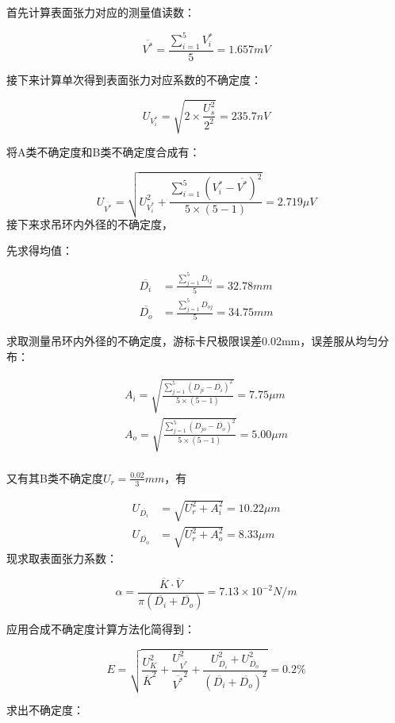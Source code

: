 \documentclass{ctexart}
\begin{document}
首先计算表面张力对应的测量值读数：

$$ \overline{V^\ast} = \frac{\sum\limits_{i=1}^{5} V_i^\ast}{5} = 1.657 mV  $$


接下来计算单次得到表面张力对应系数的不确定度： 

$$ U_{V_i^\ast} = \sqrt{2 \times \frac{U_s^2}{2^2}} = 235.7 nV$$

将A类不确定度和B类不确定度合成有：

$$ U_{\overline{V^\ast}} = \sqrt{U_{V_i^\ast}^2 + \frac{\sum\limits_{i=1}^{5} \left(V_i^\ast - \overline{V^\ast} \right)^2}{5 \times (5-1)}} = 2.719 \mu V $$
接下来求吊环内外径的不确定度，

先求得均值：

\begin{align*}
    \overline{D_i} &= \frac{\sum\limits_{j=1}^{5} D_{ij}}{5} = 32.78 mm \\
    \overline{D_o} &= \frac{\sum\limits_{j=1}^{5} D_{oj}}{5} = 34.75 mm
\end{align*}

求取测量吊环内外径的不确定度，游标卡尺极限误差0.02mm，误差服从均匀分布：

\begin{align*}
    A_i = \sqrt{\frac{\sum\limits_{j=1}^{5}\left(D_{ji}-\overline{D_i}\right)^2}{5 \times (5-1)}} = 7.75 \mu m \\
    A_o = \sqrt{\frac{\sum\limits_{j=1}^{5}\left(D_{jo}-\overline{D_o}\right)^2}{5 \times (5-1)}} = 5.00\mu m \\
\end{align*}

又有其B类不确定度$U_r = \frac{0.02}{3} mm $，有

\begin{align*}
    U_{\overline{D_i}} &= \sqrt{U_r^2 + A_i^2} = 10.22 \mu m \\
    U_{\overline{D_o}} &= \sqrt{U_r^2 + A_o^2} = 8.33 \mu m 
\end{align*}
现求取表面张力系数：

$$ \alpha = \frac{\overline{K} \cdot \overline{V}}{\pi\left(\overline{D_i}+\overline{D_o}\right)} = 7.13 \times 10^{-2} N/m $$

应用合成不确定度计算方法化简得到：

$$ E = \sqrt{\frac{U_K^2}{\overline{K}^2} + \frac{U_{\overline{V^\ast}}^2}{\overline{V^\ast}^2} + \frac{U_{\overline{D_i}}^2 + U_{\overline{D_o}}^2}{\left(\overline{D_i}+\overline{D_o}\right)^2}} = 0.2\% $$

求出不确定度：
\end{document}
